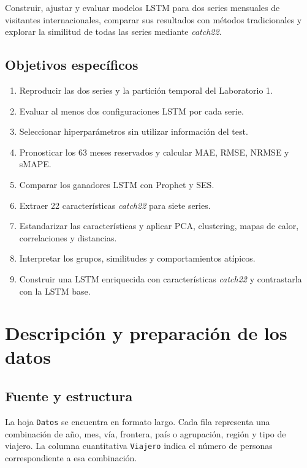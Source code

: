 \documentclass[11pt,letterpaper]{article}
\begin{document}
Construir, ajustar y evaluar modelos LSTM para dos series mensuales de
visitantes internacionales, comparar sus resultados con métodos
tradicionales y explorar la similitud de todas las series mediante
\textit{catch22}.

\subsection{Objetivos específicos}

\begin{enumerate}
  \item Reproducir las dos series y la partición temporal del Laboratorio 1.
  \item Evaluar al menos dos configuraciones LSTM por cada serie.
  \item Seleccionar hiperparámetros sin utilizar información del test.
  \item Pronosticar los 63 meses reservados y calcular MAE, RMSE, NRMSE y
  sMAPE.
  \item Comparar los ganadores LSTM con Prophet y SES.
  \item Extraer 22 características \textit{catch22} para siete series.
  \item Estandarizar las características y aplicar PCA, clustering, mapas de
  calor, correlaciones y distancias.
  \item Interpretar los grupos, similitudes y comportamientos atípicos.
  \item Construir una LSTM enriquecida con características
  \textit{catch22} y contrastarla con la LSTM base.
\end{enumerate}

\section{Descripción y preparación de los datos}

\subsection{Fuente y estructura}

La hoja \texttt{Datos} se encuentra en formato largo. Cada fila representa
una combinación de año, mes, vía, frontera, país o agrupación, región y tipo
de viajero. La columna cuantitativa \texttt{Viajero} indica el número de
personas correspondiente a esa combinación.
\end{document}
